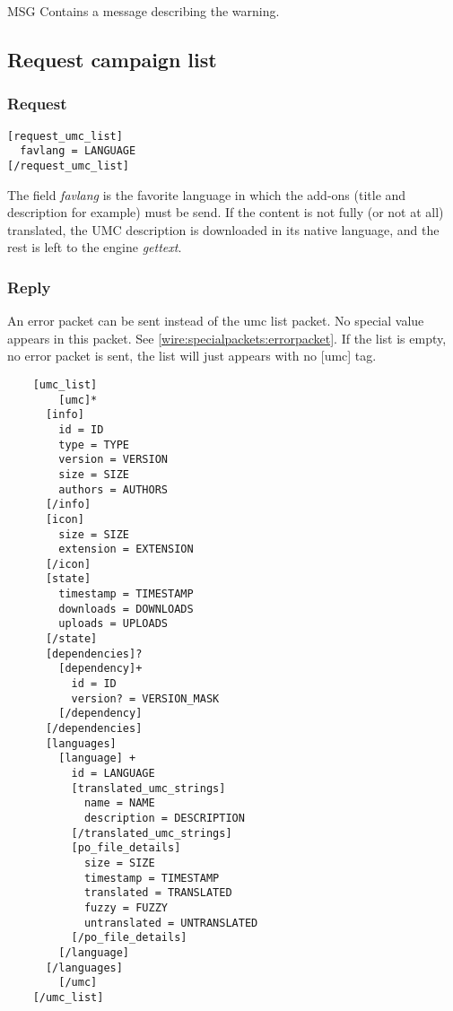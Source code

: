 \begin{description}
 \item MSG Contains a message describing the warning.
\end{description}

\subsection{Request campaign list}
\label{wire:request_campaign_list}

\subsubsection{Request}
\begin{lstlisting}
[request_umc_list]
  favlang = LANGUAGE
[/request_umc_list]
\end{lstlisting}

The field \textit{favlang} is the favorite language in which the add-ons (title and description for example) must be send. 
If the content is not fully (or not at all) translated,  the UMC description is downloaded in its native language, 
and the rest is left to the engine \textit{gettext}.
\newline
\subsubsection{Reply}

An error packet can be sent instead of the umc list packet. No special value appears in this packet. See \cref{wire:specialpackets:errorpacket}.
If the list is empty, no error packet is sent, the list will just appears with no [umc] tag.

\begin{lstlisting}
	[umc_list]
		[umc]*
      [info]
        id = ID
        type = TYPE
        version = VERSION
        size = SIZE
        authors = AUTHORS
      [/info]
      [icon]
        size = SIZE
        extension = EXTENSION
      [/icon]
      [state]
        timestamp = TIMESTAMP
        downloads = DOWNLOADS
        uploads = UPLOADS
      [/state]
      [dependencies]?
        [dependency]+
          id = ID
          version? = VERSION_MASK
        [/dependency]
      [/dependencies]
      [languages]
        [language] +
          id = LANGUAGE
          [translated_umc_strings]
            name = NAME
            description = DESCRIPTION
          [/translated_umc_strings]
          [po_file_details]
            size = SIZE
            timestamp = TIMESTAMP
            translated = TRANSLATED
            fuzzy = FUZZY
            untranslated = UNTRANSLATED
          [/po_file_details]
        [/language]
      [/languages]
		[/umc]
	[/umc_list]
\end{lstlisting}

